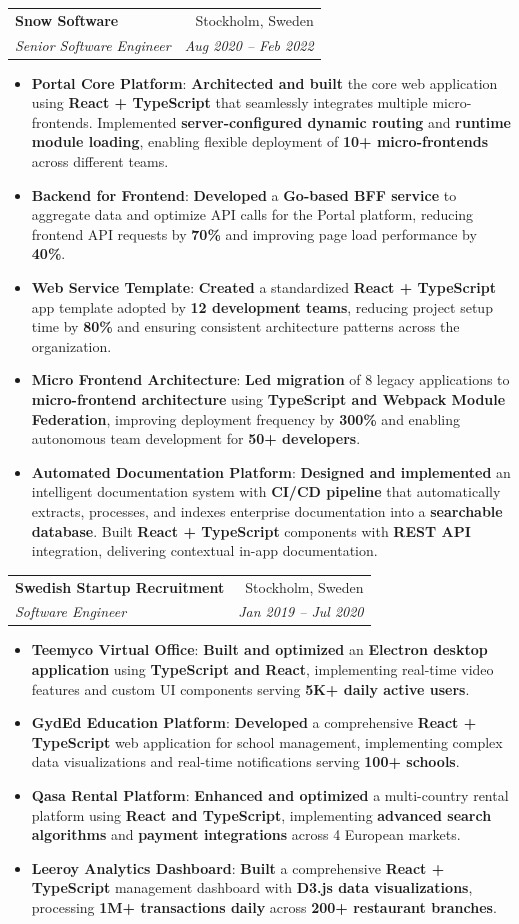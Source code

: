 \documentclass[letterpaper,11pt]{article}
\makeatletter
\newcommand{\resumeItem}[2]{
  \item\small{
    \textbf{#1}{: #2 \vspace{-2pt}}
  }
}
\newcommand{\resumeSubheading}[4]{
  \vspace{-1pt}\item
    \begin{tabular*}{0.97\textwidth}[t]{l@{\extracolsep{\fill}}r}
      \textbf{#1} & #2 \\
      \textit{\small#3} & \textit{\small #4} \\
    \end{tabular*}\vspace{-5pt}
}
\newcommand{\resumeItemListStart}{\begin{itemize}}
\newcommand{\resumeItemListEnd}{\end{itemize}\vspace{-5pt}}
\makeatother
\begin{document}
    \resumeSubheading
      {Snow Software}{Stockholm, Sweden}
      {Senior Software Engineer}{Aug 2020 -- Feb 2022}
      \resumeItemListStart
        \resumeItem{Portal Core Platform}{\textbf{Architected and built} the core web application using \textbf{React + TypeScript} that seamlessly integrates multiple micro-frontends. Implemented \textbf{server-configured dynamic routing} and \textbf{runtime module loading}, enabling flexible deployment of \textbf{10+ micro-frontends} across different teams.}
        \resumeItem{Backend for Frontend}{\textbf{Developed} a \textbf{Go-based BFF service} to aggregate data and optimize API calls for the Portal platform, reducing frontend API requests by \textbf{70\%} and improving page load performance by \textbf{40\%}.}
        \resumeItem{Web Service Template}{\textbf{Created} a standardized \textbf{React + TypeScript} app template adopted by \textbf{12 development teams}, reducing project setup time by \textbf{80\%} and ensuring consistent architecture patterns across the organization.}
        \resumeItem{Micro Frontend Architecture}{\textbf{Led migration} of 8 legacy applications to \textbf{micro-frontend architecture} using \textbf{TypeScript and Webpack Module Federation}, improving deployment frequency by \textbf{300\%} and enabling autonomous team development for \textbf{50+ developers}.}
        \resumeItem{Automated Documentation Platform}{\textbf{Designed and implemented} an intelligent documentation system with \textbf{CI/CD pipeline} that automatically extracts, processes, and indexes enterprise documentation into a \textbf{searchable database}. Built \textbf{React + TypeScript} components with \textbf{REST API} integration, delivering contextual in-app documentation.}
      \resumeItemListEnd

    \resumeSubheading
      {Swedish Startup Recruitment}{Stockholm, Sweden}
      {Software Engineer}{Jan 2019 -- Jul 2020}
      \resumeItemListStart
        \resumeItem{Teemyco Virtual Office}{\textbf{Built and optimized} an \textbf{Electron desktop application} using \textbf{TypeScript and React}, implementing real-time video features and custom UI components serving \textbf{5K+ daily active users}.}
        \resumeItem{GydEd Education Platform}{\textbf{Developed} a comprehensive \textbf{React + TypeScript} web application for school management, implementing complex data visualizations and real-time notifications serving \textbf{100+ schools}.}
        \resumeItem{Qasa Rental Platform}{\textbf{Enhanced and optimized} a multi-country rental platform using \textbf{React and TypeScript}, implementing \textbf{advanced search algorithms} and \textbf{payment integrations} across 4 European markets.}
        \resumeItem{Leeroy Analytics Dashboard}{\textbf{Built} a comprehensive \textbf{React + TypeScript} management dashboard with \textbf{D3.js data visualizations}, processing \textbf{1M+ transactions daily} across \textbf{200+ restaurant branches}.}
      \resumeItemListEnd
\end{document}
